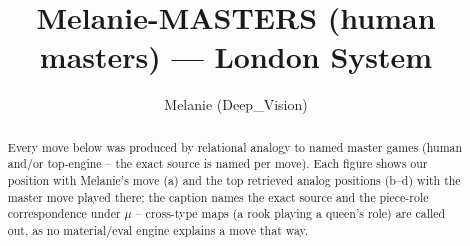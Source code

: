\documentclass[11pt]{article}
\title{Melanie-MASTERS (human masters) — London System}
\author{Melanie (Deep\_Vision)}
\date{}
\begin{document}
\maketitle

\begin{abstract}Every move below was produced by relational analogy to named master games (human and/or top-engine -- the exact source is named per move). Each figure shows our position with Melanie's move (a) and the top retrieved analog positions (b--d) with the master move played there; the caption names the exact source and the piece-role correspondence under $\mu$ -- cross-type maps (a rook playing a queen's role) are called out, as no material/eval engine explains a move that way.\end{abstract}

\begin{figure}[p]\centering
\begin{subfigure}{0.46\textwidth}\centering
\resizebox{\linewidth}{!}{%
\newchessgame
\chessboard[
  setfen={rnbq1rk1/pp3ppp/3bpn2/2pp4/3P4/3BPNB1/PPP2PPP/RN1QK2R w KQ - 0 7},
  showmover=false,
  pgfstyle=straightmove, color=movearrow, markmove={e1-g1}
]}
\caption{}
\end{subfigure}\hfill
\begin{subfigure}{0.46\textwidth}\centering
\resizebox{\linewidth}{!}{%
\newchessgame
\chessboard[
  setfen={r4rk1/pp1qppbp/3pbnp1/8/3BP3/1BN2P2/PPPQ2PP/R3K2R w KQ - 3 12},
  showmover=false,
  pgfstyle=straightmove, color=movearrow, markmove={e1-g1}
]}
\caption{}
\end{subfigure}
\\[4pt]
\begin{subfigure}{0.46\textwidth}\centering
\resizebox{\linewidth}{!}{%
\newchessgame
\chessboard[
  setfen={rnbqnrk1/pp3pp1/2pb3p/3p4/3P1B2/2NBPN1P/PPQ2PP1/R3K2R w KQ - 0 11},
  showmover=false,
  pgfstyle=straightmove, color=movearrow, markmove={e1-g1}
]}
\caption{}
\end{subfigure}\hfill
\begin{subfigure}{0.46\textwidth}\centering
\resizebox{\linewidth}{!}{%
\newchessgame
\chessboard[
  setfen={r3kb1r/pp1q1ppp/1np1p1b1/3nP3/3PNP2/1B4N1/PP4PP/R1BQ1RK1 b kq - 2 12},
  showmover=false,
  pgfstyle=straightmove, color=movearrow, markmove={e8-c8}
]}
\caption{}
\end{subfigure}

\end{figure}
\end{document}
